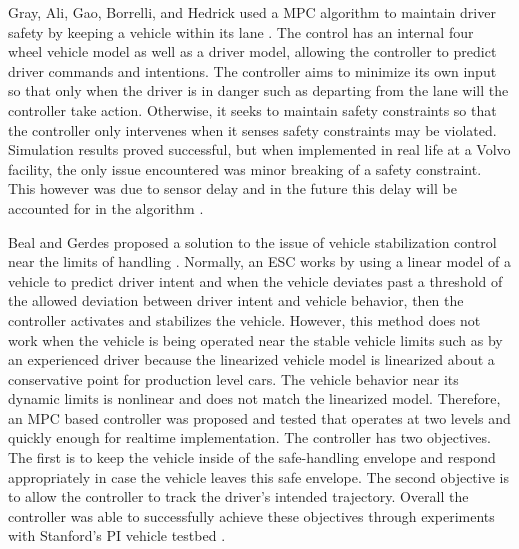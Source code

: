 \documentclass[12pt,onecolumn]{report}
\begin{document}
Gray, Ali, Gao, Borrelli, and Hedrick used a MPC algorithm to maintain driver safety by keeping a vehicle within its lane \cite{Ali&Gray2013}. The control has an internal four wheel vehicle model as well as a driver model, allowing the controller to predict driver commands and intentions. The controller aims to minimize its own input so that only when the driver is in danger such as departing from the lane will the controller take action. Otherwise, it seeks to maintain safety constraints so that the controller only intervenes when it senses safety constraints may be violated. Simulation results proved successful, but when implemented in real life at a Volvo facility, the only issue encountered was minor breaking of a safety constraint. This however was due to sensor delay and in the future this delay will be accounted for in the algorithm \cite{Ali&Gray2013}.

Beal and Gerdes proposed a solution to the issue of vehicle stabilization control near the limits of handling \cite{Beal&Gerdes2013}. Normally, an ESC works by using a linear model of a vehicle to predict driver intent and when the vehicle deviates past a threshold of the allowed deviation between driver intent and vehicle behavior, then the controller activates and stabilizes the vehicle. However, this method does not work when the vehicle is being operated near the stable vehicle limits such as by an experienced driver because the linearized vehicle model is linearized about a conservative point for production level cars. The vehicle behavior near its dynamic limits is nonlinear and does not match the linearized model. Therefore, an MPC based controller was proposed and tested that operates at two levels and quickly enough for realtime implementation. The controller has two objectives. The first is to keep the vehicle inside of the safe-handling envelope and respond appropriately in case the vehicle leaves this safe envelope. The second objective is to allow the controller to track the driver's intended trajectory. Overall the controller was able to successfully achieve these objectives through experiments with Stanford's PI vehicle testbed \cite{Beal&Gerdes2013}.
\end{document}

